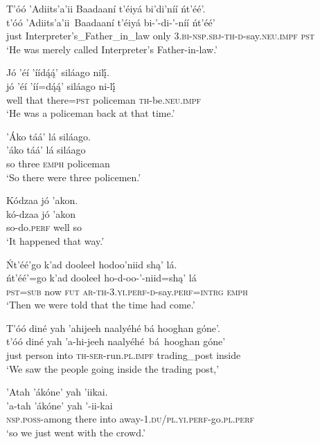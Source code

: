 \ea\label{ex:text1-29-9}
T’óó ’Adiits’a’ii Baadaaní t’éiyá bi’di’níí ńt’éé’.\\
\gll t’óó	’Adiits’a’ii~{Baadaaní}	t’éiyá	bi-’-di-’-níí	ńt’éé’\\
     just	Interpreter's\_Father\_in\_law	only	3.\textsc{bi}-\textsc{nsp}.\textsc{sbj}-\textsc{th}-\textsc{d}-say.\textsc{neu}.\textsc{impf}	\textsc{pst}\\
\glt `He was merely called Interpreter's Father-in-law.'
\z

\ea\label{ex:text1-29-10}
Jó ’éí ’íídą́ą́’ siláago nilį́.\\
\gll jó	’éí	’íí=dą́ą́’	siláago	ni-lį́\\
     well	that	there=\textsc{pst}	policeman	\textsc{th}-be.\textsc{neu}.\textsc{impf}\\
\glt `He was a policeman back at that time.'
\z

\ea\label{ex:text1-29-11}
’Áko táá’ lá siláago.\\
\gll ’áko	táá’	lá	siláago\\
     so	three	\textsc{emph}	policeman\\
\glt `So there were three policemen.'
\z

\ea\label{ex:text1-29-12}
Kódzaa jó ’akon.\\
\gll kó-dzaa	jó	’akon\\
     so-do.\textsc{perf}	well	so\\
\glt `It happened that way.'
\z

\ea\label{ex:text1-29-13}
Ńt’éé’go k’ad dooleeł hodoo’niid shą’ lá.\\
\gll ńt’éé’=go	k’ad	dooleeł	ho-d-oo-’-niid=shą’	lá\\
     \textsc{pst}=\textsc{sub}	now	\textsc{fut}	\textsc{ar}-\textsc{th}-3.\textsc{yi}.\textsc{perf}-\textsc{d}-say.\textsc{perf}=\textsc{intrg}	\textsc{emph}\\
\glt `Then we were told that the time had come.'
\z

\ea\label{ex:text1-29-14}
T’óó diné yah ’ahijeeh naalyéhé bá hooghan góne’.\\
\gll t’óó	diné	yah	’a-hi-jeeh	naalyéhé~bá~{hooghan}	góne’\\
     just	person	into	\textsc{th}-\textsc{ser}-run.\textsc{pl}.\textsc{impf}	trading\_post	inside\\
\glt `We saw the people going inside the trading post,'
\z

\ea\label{ex:text1-29-15}
’Atah ’ákóne’ yah ’iikai.\\
\gll ’a-tah	’ákóne’	yah	’-ii-kai\\
     \textsc{nsp}.\textsc{poss}-among	there	into	away-1.\textsc{du}/\textsc{pl}.\textsc{yi}.\textsc{perf}-go.\textsc{pl}.\textsc{perf}\\
\glt `so we just went with the crowd.'
\z

